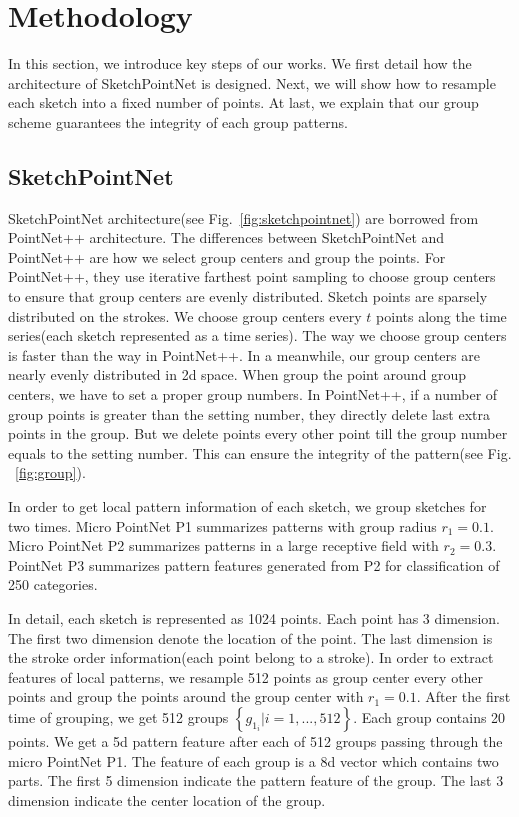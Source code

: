 \section{Methodology}
\label{sec:methodology}

In this section, we introduce key steps of our works. We first detail how the architecture of SketchPointNet is designed. Next, we will show how to resample each sketch into a fixed number of points. At last, we explain that our group scheme guarantees the integrity of each group patterns.

\subsection{SketchPointNet}
\label{ssec:sketch_point_net}

SketchPointNet architecture(see Fig.~\ref{fig:sketchpointnet}) are borrowed from PointNet++ architecture. The differences between SketchPointNet and PointNet++ are how we select group centers and group the points. For PointNet++, they use iterative farthest point sampling to choose group centers to ensure that group centers are evenly distributed. Sketch points are sparsely distributed on the strokes. We choose group centers every $t$ points along the time series(each sketch represented as a time series). The way we choose group centers is faster than the way in PointNet++. In a meanwhile,
our group centers are nearly evenly distributed in 2d space. When group the point around group centers, we have to set a proper group numbers. In PointNet++, if a number of group points  is greater than the setting number, they directly delete last extra points in the group. But we delete points every other point till the group number equals to the setting number. This can ensure the integrity of the pattern(see Fig. ~\ref{fig:group}).

In order to get local pattern information of each sketch, we group sketches for two times. Micro PointNet P1 summarizes patterns with group radius $r_1 = 0.1$. Micro PointNet P2 summarizes patterns in a large receptive field with $r_2 = 0.3$. PointNet P3 summarizes pattern features generated from P2 for classification of 250 categories.

In detail, each sketch is represented as 1024 points. Each point has 3 dimension. The first two dimension denote the location of the point. The last dimension is the stroke order information(each point belong to a stroke). In order to extract features of local patterns, we resample 512 points as group center every other points and group the points around the group center with $r_1 = 0.1$. After the first time of grouping, we get 512 groups $\left\{ g_{1_i}| i = 1, ..., 512 \right\}$. Each group contains 20 points. We get a 5d pattern feature after each of 512 groups passing through the micro PointNet P1. The feature of each group is a 8d vector which contains two parts. The first 5 dimension indicate the pattern feature of the group. The last 3 dimension indicate the center location of the group.

